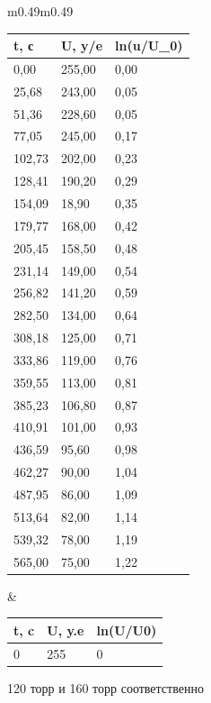 \documentclass[a4paper,12pt]{article}
\theoremstyle{plain} %
\theoremstyle{definition} %
\theoremstyle{remark} %
\begin{document}
	
\begin{figure}[H]
\begin{tabular}{m{0.49\linewidth}m{0.49\linewidth}}
	
\begin{flushleft}
\caption{120 торр и 160 торр соответственно}
\label{my-label}
\begin{tabular}{|l|l|l|}
\hline
t, с   & U, y/e & ln(u/U\_0) \\ \hline
0,00   & 255,00 & 0,00       \\ \hline
25,68  & 243,00 & 0,05       \\ \hline
51,36  & 228,60 & 0,05       \\ \hline
77,05  & 245,00 & 0,17       \\ \hline
102,73 & 202,00 & 0,23       \\ \hline
128,41 & 190,20 & 0,29       \\ \hline
154,09 & 18,90  & 0,35       \\ \hline
179,77 & 168,00 & 0,42       \\ \hline
205,45 & 158,50 & 0,48       \\ \hline
231,14 & 149,00 & 0,54       \\ \hline
256,82 & 141,20 & 0,59       \\ \hline
282,50 & 134,00 & 0,64       \\ \hline
308,18 & 125,00 & 0,71       \\ \hline
333,86 & 119,00 & 0,76       \\ \hline
359,55 & 113,00 & 0,81       \\ \hline
385,23 & 106,80 & 0,87       \\ \hline
410,91 & 101,00 & 0,93       \\ \hline
436,59 & 95,60  & 0,98       \\ \hline
462,27 & 90,00  & 1,04       \\ \hline
487,95 & 86,00  & 1,09       \\ \hline
513,64 & 82,00  & 1,14       \\ \hline
539,32 & 78,00  & 1,19       \\ \hline
565,00 & 75,00  & 1,22       \\ \hline
\end{tabular}
\end{flushleft}
&
\label{my-label}
\begin{tabular}{|l|l|l|}
\hline
t, c   & U, y.e & ln(U/U0) \\ \hline
0      & 255    & 0        \\ \hline

\end{tabular}
\end{tabular}
\end{figure}
\end{document}
